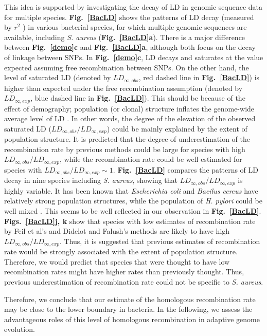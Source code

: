 \documentclass[twoside,twocolumn, letterpaper]{article}
\begin{document}
This idea is supported by investigating the decay of LD in genomic sequence data for multiple species. {\bf Fig.~\ref{BacLD}} shows the patterns of LD decay (measured by $r^2$ \cite[]{Hill_1968_65}) in various bacterial species, for which multiple genomic sequences are available, including \emph{S. aureus} ({\bf Fig.~\ref{BacLD}a}). There is a major difference between {\bf Fig.~\ref{demo}c} and {\bf Fig.~\ref{BacLD}a}, although both focus on the decay of linkage between SNPs. In {\bf Fig.~\ref{demo}c}, LD decays and saturates at the value expected assuming free recombination between SNPs. On the other hand, the level of saturated LD (denoted by $LD_{\infty, obs}$, red dashed line in {\bf Fig.~\ref{BacLD}}) is higher than expected under the free recombination assumption (denoted by $LD_{\infty, exp}$, blue dashed line in {\bf Fig.~\ref{BacLD}}). This should be because of the effect of demography; population (or clonal) structure inflates the genome-wide average level of LD \cite[]{Ohta_1982_17246079}. In other words, the degree of the elevation of the observed saturated LD ($LD_{\infty, obs}/LD_{\infty, exp}$) could be mainly explained by the extent of population structure. It is predicted that the degree of underestimation of the recombination rate by previous methods could be large for species with high $LD_{\infty, obs}/LD_{\infty, exp}$, while the recombination rate could be well estimated for species with $LD_{\infty, obs}/LD_{\infty, exp}\sim1$. {\bf Fig.~\ref{BacLD}} compares the patterns of LD decay in nine species including \emph{S. aureus}, showing that $LD_{\infty, obs}/LD_{\infty, exp}$ is highly variable. It has been known that \emph{Escherichia coli} and \emph{Bacilus cereus} have relatively strong population structures, while the population of \emph{H. pylori} could be well mixed \cite[]{Selander_1980_56,Priest_2004_15547268}. This seems to be well reflected in our observation in {\bf Fig.~\ref{BacLD}}. 
{\bf Figs.~\ref{BacLD}j, k} show that species with low estimates of recombination rate by Feil et al's and Didelot and Falush's methods 
 are likely to have high $LD_{\infty, obs}/LD_{\infty, exp}$. Thus, it is suggested that previous estimates of recombination rate would be strongly associated with the extent of population structure. Therefore, we would predict that species that were thought to have low recombination rates might have higher rates than previously thought. Thus, previous underestimation of recombination rate could  not be specific to \emph{S. aureus}.

Therefore, we conclude that our estimate of the homologous recombination rate may be close to the lower boundary in bacteria. In the following, we assess the advantageous roles of this level of homologous recombination in adaptive genome evolution.
\end{document}
